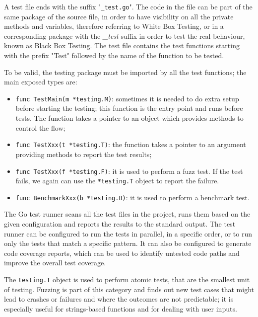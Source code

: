 A test file ends with the suffix "\texttt{\_test.go}". The code in the file can be part of the same package of the source file, in order to have visibility on all the private methods and variables, therefore referring to White Box Testing, or in a corresponding package with the \textit{\_test} suffix in order to test the real behaviour, known as Black Box Testing. The test file contains the test functions starting with the prefix "Test" followed by the name of the function to be tested.

To be valid, the testing package must be imported by all the test functions; the main exposed types are:
\begin{itemize}
  \item \texttt{func TestMain(m *testing.M)}: sometimes it is needed to do extra setup before starting the testing; this function is the entry point and runs before tests. The function takes a pointer to an object which provides methods to control the flow;
  \item \texttt{func TestXxx(t *testing.T)}: the function takes a pointer to an argument providing methods to report the test results;
  \item \texttt{func TestXxx(f *testing.F)}: it is used to perform a fuzz test. If the test fails, we again can use the \texttt{*testing.T} object to report the failure.
  \item \texttt{func BenchmarkXxx(b *testing.B)}: it is used to perform a benchmark test.
\end{itemize}

The Go test runner scans all the test files in the project, runs them based on the given configuration and reports the results to the standard output. The test runner can be configured to run the tests in parallel, in a specific order, or to run only the tests that match a specific pattern. It can also be configured to generate code coverage reports, which can be used to identify untested code paths and improve the overall test coverage.

The \texttt{testing.T} object is used to perform atomic tests, that are the smallest unit of testing. Fuzzing is part of this category and finds out new test cases that might lead to crashes or failures and where the outcomes are not predictable; it is especially useful for strings-based functions and for dealing with user inputs.

